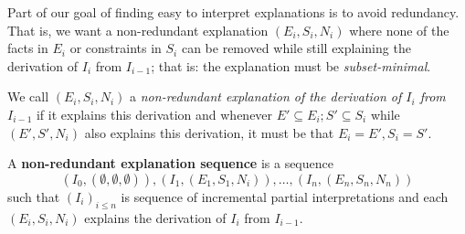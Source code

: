 Part of our goal of finding easy to interpret explanations is to avoid redundancy. 
That is, we want a non-redundant explanation $(E_i,S_i,N_i)$ where none of the facts in $E_i$ or constraints in $S_i$ can be removed while still explaining the derivation of $I_i$ from $I_{i-1}$; that is: the explanation must be \textit{subset-minimal}. 
\begin{definition}
 We call $(E_i,S_i,N_i)$ a \emph{non-redundant explanation of  the derivation of $I_i$ from $I_{i-1}$} if it explains this derivation and whenever $E'\subseteq E_i; S'\subseteq S_i$ while $(E',S',N_i)$ also explains this derivation, it must be that $E_i=E', S_i=S'$. 
\end{definition}

\begin{definition} \label{def:nonred}
A \textbf{non-redundant explanation sequence} is a sequence 
\[(I_0,(\emptyset,\emptyset,\emptyset)), (I_1,(E_1,S_1,N_i)), \dots ,(I_n,(E_n,S_n,N_n))\]
such that $(I_i)_{i\leq n}$ is sequence of incremental partial interpretations and each $(E_i,S_i,N_i)$ explains the derivation of $I_i$ from $I_{i-1}$.
\end{definition} 





